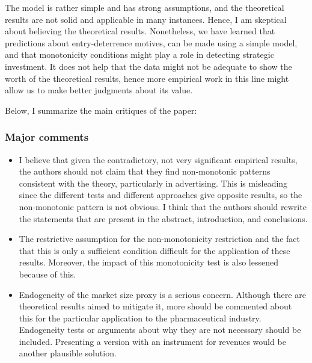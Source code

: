 \documentclass{article}
\theoremstyle{definition}
\begin{document}
The model is rather simple and has strong assumptions, and the theoretical results are not solid and applicable in many instances. Hence, I am skeptical about believing the theoretical results.  Nonetheless, we have learned that predictions about entry-deterrence motives, can be made using a simple model, and that monotonicity conditions might play a role in detecting strategic investment. It does not help that the data might not be adequate to show the worth of the theoretical results, hence more empirical work in this line might allow us to make better judgments about its value.

Below, I summarize the main critiques of the paper:   

\subsubsection*{Major comments}

\begin{itemize}

    \item I believe that given the contradictory, not very significant empirical results, the authors should not claim that they find non-monotonic patterns consistent with the theory, particularly in advertising. This is misleading since the different tests and different approaches give opposite results, so the non-monotonic pattern is not obvious. I think that the authors should rewrite the statements that are present in the abstract, introduction, and conclusions. 
    
    \item The restrictive assumption for the non-monotonicity restriction and the fact that this is only a sufficient condition difficult for the application of these results. Moreover, the impact of this monotonicity test is also lessened because of this. 
    
    \item Endogeneity of the market size proxy is a serious concern. Although there are theoretical results aimed to mitigate it, more should be commented about this for the particular application to the pharmaceutical industry. Endogeneity tests or arguments about why they are not necessary should be included. Presenting a version with an instrument for revenues would be another plausible solution. 
    
    \end{itemize}
\end{document}
